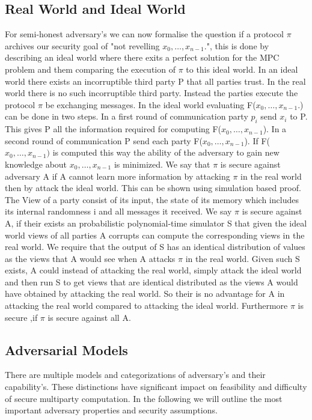 \subsection{Real World and Ideal World}
For semi-honest adversary's we can now formalise the question if a protocol $ \pi $ archives our security goal of "not revelling $ x_0,\dots,x_{n-1}. $", this is done by describing an ideal world where there exits a perfect solution for the MPC problem and them comparing the execution of $ \pi $ to this ideal world. In an ideal world there exists an incorruptible third party P that all parties trust. In the real world there is no such incorruptible third party. Instead the parties execute the protocol $ \pi $ be exchanging messages.
In the ideal world evaluating F($ x_0,\dots,x_{n-1}. $) can be done in two steps. In a first round of communication party $ p_i $ send $x_i $ to P.
This gives P all the information required for computing F($ x_0,\dots,x_{n-1} $). In a second round of communication P send each party F($ x_0,\dots,x_{n-1} $).
If F($ x_0,\dots,x_{n-1}) $ is computed this way the ability of the adversary to gain new knowledge about $ x_0,\dots,x_{n-1} $ is minimized. We say that  $ \pi $ is secure against adversary A if A cannot learn more information by attacking $ \pi $ in the real world then by attack the ideal world. This can be shown using simulation based proof. 
The View of a party consist of its input, the state of its memory which includes its internal randomness i and all messages it received. 
We say $ \pi $ is secure against A,  if their exists an probabilistic polynomial-time simulator S that given the ideal world views of all parties A corrupts can compute the corresponding views in the real world. We require that the output of S has an identical distribution of values as the views that A would see when A attacks $ \pi $ in the real world. Given such S exists, A could instead of attacking the real world, simply attack the ideal world and then run S to get views that are identical distributed as the views A would have obtained by attacking the real world. So their is no advantage for A in attacking the real world compared to attacking the ideal world. Furthermore $ \pi $ is secure ,if $ \pi $ is secure against all A.       

\subsection{Adversarial Models}
There are multiple models and categorizations of adversary's and their capability's. These distinctions have significant impact on feasibility and difficulty of secure multiparty computation. In the following we will outline the most important adversary properties and security assumptions. 

